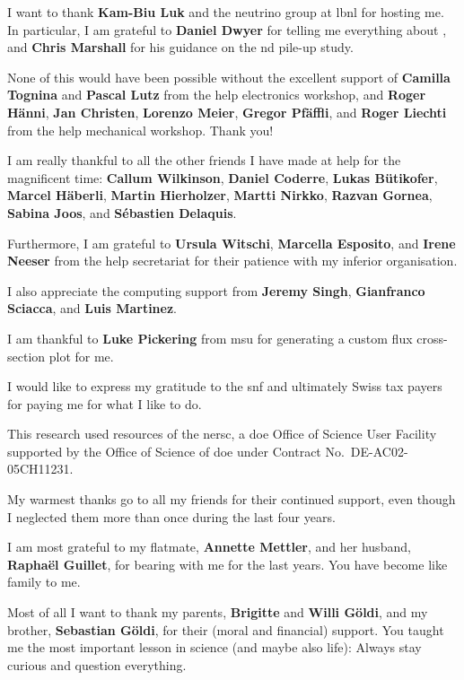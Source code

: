 I want to thank \textbf{Kam-Biu Luk} and the neutrino group at \gls{lbnl} for hosting me.
In particular, I am grateful to \textbf{Daniel Dwyer} for telling me everything about \larpix{}, and \textbf{Chris Marshall} for his guidance on the \gls{nd} pile-up study.

None of this would have been possible without the excellent support of \textbf{Camilla Tognina} and \textbf{Pascal Lutz} from the \gls{help} electronics workshop, and \textbf{Roger Hänni}, \textbf{Jan Christen}, \textbf{Lorenzo Meier}, \textbf{Gregor Pfäffli}, and \textbf{Roger Liechti} from the \gls{help} mechanical workshop. Thank you!

I am really thankful to all the other friends I have made at \gls{help} for the magnificent time: \textbf{Callum Wilkinson}, \textbf{Daniel Coderre}, \textbf{Lukas Bütikofer}, \textbf{Marcel Häberli}, \textbf{Martin Hierholzer}, \textbf{Martti Nirkko}, \textbf{Razvan Gornea}, \textbf{Sabina Joos}, and \textbf{Sébastien Delaquis}.

Furthermore, I am grateful to \textbf{Ursula Witschi}, \textbf{Marcella Esposito}, and \textbf{Irene Neeser} from the \gls{help} secretariat for their patience with my inferior organisation.

I also appreciate the computing support from \textbf{Jeremy Singh}, \textbf{Gianfranco Sciacca}, and \textbf{Luis Martinez}.

I am thankful to \textbf{Luke Pickering} from \gls{msu} for generating a custom flux cross-section plot for me.

I would like to express my gratitude to the \gls{snf} and ultimately Swiss tax payers for paying me for what I like to do.

This research used resources of the \gls{nersc}, a \gls{doe} Office of Science User Facility supported by the Office of Science of \gls{doe} under Contract No.\ DE-AC02-05CH11231.

My warmest thanks go to all my friends for their continued support, even though I neglected them more than once during the last four years.

I am most grateful to my flatmate, \textbf{Annette Mettler}, and her husband, \textbf{Raphaël Guillet}, for bearing with me for the last years.
You have become like family to me.

Most of all I want to thank my parents, \textbf{Brigitte} and \textbf{Willi Göldi}, and my brother, \textbf{Sebastian Göldi}, for their (moral and financial) support.
You taught me the most important lesson in science (and maybe also life): Always stay curious and question everything.